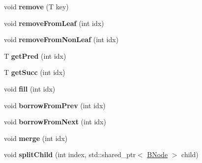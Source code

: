 \begin{DoxyCompactItemize}
\item 
\mbox{\label{classBTree_1_1BNode_a2e926c4518aecdbb1dcf853431edfb0c}} 
void {\bfseries remove} (T key)
\item 
\mbox{\label{classBTree_1_1BNode_a1153066a0735afbd355c762795b68222}} 
void {\bfseries remove\+From\+Leaf} (int idx)
\item 
\mbox{\label{classBTree_1_1BNode_acea1502de0852161a72a4c11e122e58e}} 
void {\bfseries remove\+From\+Non\+Leaf} (int idx)
\item 
\mbox{\label{classBTree_1_1BNode_afacc18e039955c714241d33341649656}} 
T {\bfseries get\+Pred} (int idx)
\item 
\mbox{\label{classBTree_1_1BNode_af5d36fa614e035a65758f716f5902d82}} 
T {\bfseries get\+Succ} (int idx)
\item 
\mbox{\label{classBTree_1_1BNode_a20d3152742afa0fbb11e413a0c73ceb9}} 
void {\bfseries fill} (int idx)
\item 
\mbox{\label{classBTree_1_1BNode_a1ee99a5c0649e19e8a34934ff8dba85b}} 
void {\bfseries borrow\+From\+Prev} (int idx)
\item 
\mbox{\label{classBTree_1_1BNode_acda705e13267fdedbfd27f017668a9bf}} 
void {\bfseries borrow\+From\+Next} (int idx)
\item 
\mbox{\label{classBTree_1_1BNode_ac3caae8aac87f7bdce9960a658f9ad87}} 
void {\bfseries merge} (int idx)
\item 
\mbox{\label{classBTree_1_1BNode_a0b356b6ac1ec3d8e0cbfb68d9e5f7582}} 
void {\bfseries split\+Child} (int index, std\+::shared\+\_\+ptr$<$ \hyperlink{classBTree_1_1BNode}{B\+Node} $>$ child)
\end{DoxyCompactItemize}
